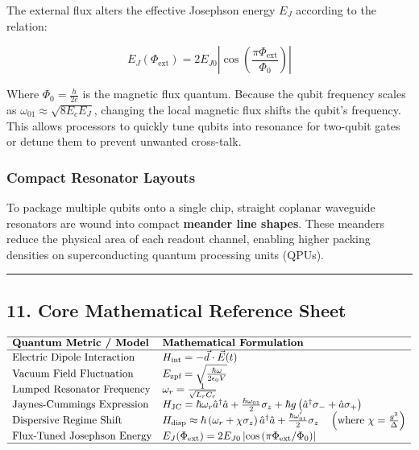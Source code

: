 \documentclass[
]{article}
\begin{document}
The external flux alters the effective Josephson energy \(E_J\)
according to the relation:

\[E_J(\Phi_{\text{ext}}) = 2E_{J0} \left| \cos\left( \frac{\pi \Phi_{\text{ext}}}{\Phi_0} \right) \right|\]

Where \(\Phi_0 = \frac{h}{2e}\) is the magnetic flux quantum. Because
the qubit frequency scales as \(\omega_{01} \approx \sqrt{8E_c E_J}\),
changing the local magnetic flux shifts the qubit's frequency. This
allows processors to quickly tune qubits into resonance for two-qubit
gates or detune them to prevent unwanted cross-talk.

\subsubsection{Compact Resonator
Layouts}\label{compact-resonator-layouts}

To package multiple qubits onto a single chip, straight coplanar
waveguide resonators are wound into compact \textbf{meander line
shapes}. These meanders reduce the physical area of each readout
channel, enabling higher packing densities on superconducting quantum
processing units (QPUs).

\begin{center}\rule{0.5\linewidth}{0.5pt}\end{center}

\subsection{11. Core Mathematical Reference
Sheet}\label{core-mathematical-reference-sheet-1}

\[\begin{array}{ll}
\hline
\textbf{Quantum Metric / Model} & \textbf{Mathematical Formulation} \\ \hline
\text{Electric Dipole Interaction} & H_{\text{int}} = -\vec{d} \cdot \vec{E}(t) \\
\text{Vacuum Field Fluctuation} & E_{\text{zpf}} = \sqrt{\frac{\hbar \omega}{2 \epsilon_0 V}} \\
\text{Lumped Resonator Frequency} & \omega_r = \frac{1}{\sqrt{L_r C_r}} \\
\text{Jaynes-Cummings Expression} & H_{\text{JC}} = \hbar \omega_r \hat{a}^\dagger \hat{a} + \frac{\hbar \omega_{01}}{2} \sigma_z + \hbar g \left( \hat{a}^\dagger \sigma_- + \hat{a} \sigma_+ \right) \\
\text{Dispersive Regime Shift} & H_{\text{disp}} \approx \hbar \left( \omega_r + \chi \sigma_z \right) \hat{a}^\dagger \hat{a} + \frac{\hbar \omega_{01}'}{2} \sigma_z \quad \left(\text{where } \chi = \frac{g^2}{\Delta}\right) \\
\text{Flux-Tuned Josephson Energy} & E_J(\Phi_{\text{ext}}) = 2E_{J0} \left| \cos\left( \pi \Phi_{\text{ext}} / \Phi_0 \right) \right| \\ \hline
\end{array}\]
\end{document}
